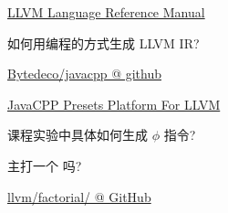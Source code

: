 
\begin{frame}{}
	\begin{center}
		\href{https://llvm.org/docs/LangRef.html}{LLVM Language Reference Manual}

		\vspace{0.50cm}
		如何用编程的方式生成 LLVM IR?
	\end{center}
\end{frame}

\begin{frame}{}
	\begin{center}
		\href{https://github.com/bytedeco/javacpp}{Bytedeco/javacpp @ github}

		\vspace{0.30cm}
		\href{https://mvnrepository.com/artifact/org.bytedeco/llvm-platform/15.0.3-1.5.8}{JavaCPP Presets Platform For LLVM}

		\vspace{0.50cm}
	\end{center}
\end{frame}

\begin{frame}{}
	\begin{center}
		课程实验中具体如何生成 $\phi$ 指令?

		\vspace{0.30cm}
		\vspace{0.30cm}

		主打一个 吗?
	\end{center}
\end{frame}

\begin{frame}{}
	\begin{center}
		\href{https://github.com/courses-at-nju-by-hfwei/2024-compilers-coding/tree/main/src/main/java/llvm/factorial}{llvm/factorial/ @ GitHub}

		\vspace{0.50cm}
	\end{center}
\end{frame}

